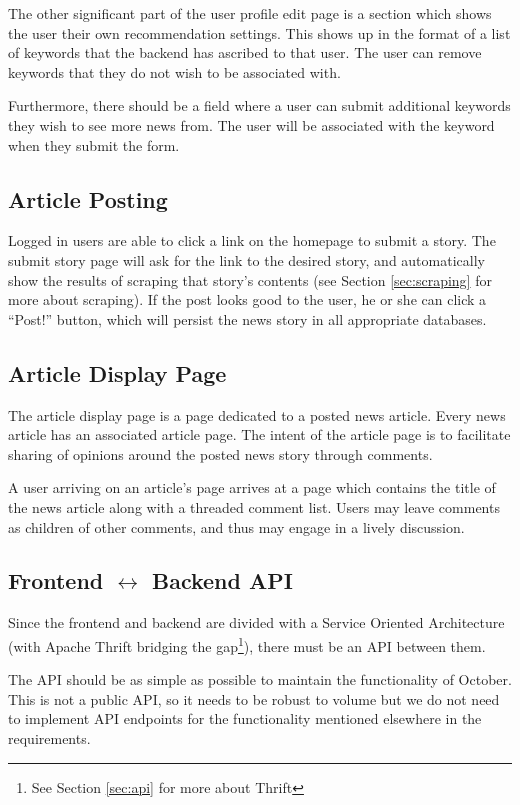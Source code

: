 \documentclass[11pt,letterpaper]{article}
\begin{document}
The other significant part of the user profile edit page is a section which shows the user their own recommendation settings.
This shows up in the format of a list of keywords that the backend has ascribed to that user.
The user can remove keywords that they do not wish to be associated with.

Furthermore, there should be a field where a user can submit additional keywords they wish to see more news from.
The user will be associated with the keyword when they submit the form.

\subsection{Article Posting}
Logged in users are able to click a link on the homepage to submit a story.
The submit story page will ask for the link to the desired story, and automatically show the results of scraping that story's contents (see Section \ref{sec:scraping} for more about scraping).
If the post looks good to the user, he or she can click a ``Post!'' button, which will persist the news story in all appropriate databases.

\subsection{Article Display Page}
The article display page is a page dedicated to a posted news article. Every news article has an associated article page.
The intent of the article page is to facilitate sharing of opinions around the posted news story through comments.

A user arriving on an article's page arrives at a page which contains the title of the news article along with a threaded comment list.
Users may leave comments as children of other comments, and thus may engage in a lively discussion.

\subsection{Frontend $\leftrightarrow$ Backend API}
Since the frontend and backend are divided with a Service Oriented Architecture (with Apache Thrift bridging the gap\footnote{See Section \ref{sec:api} for more about Thrift}), there must be an API between them.

The API should be as simple as possible to maintain the functionality of October. This is not a public API, so it needs to be robust to volume but we do not need to implement API endpoints for the functionality mentioned elsewhere in the requirements.
\end{document}
